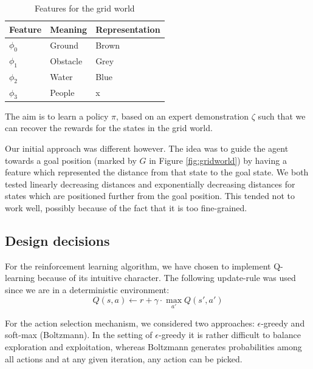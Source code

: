 \documentclass[10pt,a4paper,twocolumn]{article}
\begin{document}
\begin{table}[h]
\centering
\begin{tabular}{|l|l|l|}
	\hline
	Feature		&	Meaning		&	Representation\\\hline
	$\phi_0$		&	Ground		&	Brown\\
	$\phi_1$		&	Obstacle		&	Grey\\
	$\phi_2$		&	Water		&	Blue\\
	$\phi_3$		&	People		&	x\\
	\hline
\end{tabular}
\caption{Features for the grid world}
\end{table}

The aim is to learn a policy $\pi$, based on an expert demonstration $\zeta$ such that we can recover the rewards for the states in the grid world.

Our initial approach was different however. The idea was to guide the agent towards a goal position (marked by $G$ in Figure \ref{fig:gridworld}) by having a feature which represented the distance from that state to the goal state.
We both tested linearly decreasing distances and exponentially decreasing distances for states which are positioned further from the goal position. This tended not to work well, possibly because of the fact that it is too fine-grained.

\subsection{Design decisions}
For the reinforcement learning algorithm, we have chosen to implement Q-learning because of its intuitive character. The following update-rule was used since we are in a deterministic environment:
$$Q(s,a) \gets r + \gamma\cdot \max\limits_{a'}Q(s',a')$$

For the action selection mechanism, we considered two approaches: $\epsilon$-greedy and soft-max (Boltzmann). In the setting of $\epsilon$-greedy it is rather difficult to balance exploration and exploitation, whereas Boltzmann generates probabilities among all actions and at any given iteration, any action can be picked.

\end{document}
